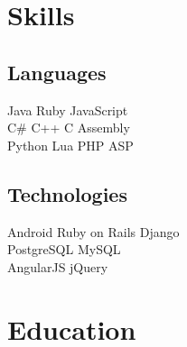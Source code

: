 \documentclass[]{peter_resume}
\begin{document}




\begin{minipage}[t]{0.33\textwidth}


\section{Skills}
\subsection{Languages}
Java \textbullet{}
Ruby \textbullet{}
JavaScript \\
\vspace{0.1cm}
C\# \textbullet{}
C++ \textbullet{}
C \textbullet{}
Assembly \\
\vspace{0.1cm}
Python \textbullet{}
Lua \textbullet{}
PHP \textbullet{}
ASP \\
\vspace{0.25cm}
\subsection{Technologies}
Android \textbullet{}
Ruby on Rails \textbullet{}
Django \\
PostgreSQL \textbullet{}
MySQL \\
AngularJS \textbullet{}
jQuery
\sectionsep


\section{Education} 


\end{minipage}
\end{document}
